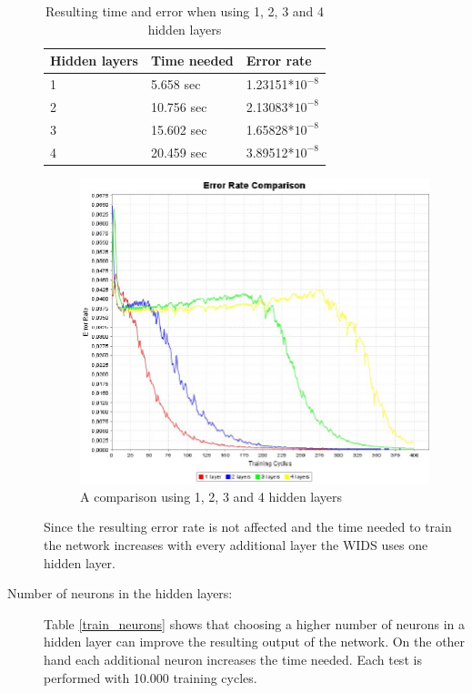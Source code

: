 \begin{description}
\begin{table}[htbp]
	\vspace{1.5em}
	\begin{center}
		\begin{tabular}{|l|l|l|}
		\hline
		\bf{Hidden layers}&\bf{Time needed}&{\bf Error rate}\\
		\hline
		1&5.658 sec&1.23151*$10^{-8}$\\
		\hline
		2&10.756 sec&2.13083*$10^{-8}$\\
		\hline
		3&15.602 sec&1.65828*$10^{-8}$\\
		\hline
		4&20.459 sec&3.89512*$10^{-8}$\\
		\hline
		\end{tabular}
	\end{center}
	\vspace{-1em}
	\caption{Resulting time and error when using 1, 2, 3 and 4 hidden layers}
	\label{train_layers}
\end{table}

\begin{figure}[htbp]
	\begin{center}
		\includegraphics[width=0.7\columnwidth]{graphics/Error_hidden_layers}
	\end{center}
	\vspace{-1em}
	\caption{A comparison using 1, 2, 3 and 4 hidden layers}
	\label{error_hidden}
	\vspace{1.5em}
\end{figure}

Since the resulting error rate is not affected and the time needed to train the network increases with every additional layer the WIDS uses one hidden layer.

\pagebreak

	\item [Number of neurons in the hidden layers:] Table \ref{train_neurons} shows that choosing a higher number of neurons in a hidden layer can improve the resulting output of the network. On the other hand each additional neuron increases the time needed. Each test is performed with 10.000 training cycles.


\end{description}

